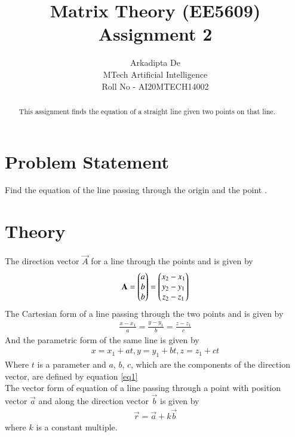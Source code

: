 \documentclass[journal,12pt,twocolumn]{IEEEtran}
\begin{document}
     \def\rightbox#1{\makebox[0in][r]{#1}}
     \def\centbox#1{\makebox[0in]{#1}}
     \def\topbox#1{\raisebox{-\baselineskip}[0in][0in]{#1}}
     \def\midbox#1{\raisebox{-0.5\baselineskip}[0in][0in]{#1}}
\vspace{3cm}
\title{Matrix Theory (EE5609) Assignment 2}
\author{Arkadipta De \\MTech Artificial Intelligence\\Roll No - AI20MTECH14002}
\maketitle
\newpage
\bigskip
\renewcommand{\thefigure}{\theenumi}
\renewcommand{\thetable}{\theenumi}
\begin{abstract}
This assignment finds the equation of a straight line given two points on that line.
\end{abstract}

\section{\textbf{Problem Statement}}Find the equation of the line passing through the origin and the point .

\section{\textbf{Theory}}
The direction vector $\vec{A}$ for a line through the points  and  is given by
\begin{align}\label{eq1}
\mathbf{A}=\begin{pmatrix} a \\ b \\ b \end{pmatrix}=\begin{pmatrix} x_2-x_1 \\ y_2-y_1 \\ z_2-z_1 \end{pmatrix}
\end{align}
The Cartesian form of a line passing through the two points  and  is given by
\begin{align}\label{eq2}
\frac{x - x_1}{a}=\frac{y - y_1}{b}=\frac{z - z_1}{c}
\end{align}
And the parametric form of the same line is given by
\begin{align}\label{eq3}
x=x_1+at, y=y_1+bt, z=z_1+ct
\end{align}
Where $t$ is a parameter and $a$, $b$, $c$, which are the components of the direction vector, are defined by equation \ref{eq1}\\
The vector form of equation of a line passing through a point with position vector $\vec{a}$ and along the direction vector $\vec{b}$ is given by
\begin{align}\label{eq4}
\vec{r}=\vec{a}+k\vec{b}
\end{align}
where $k$ is a constant multiple.
\end{document}
